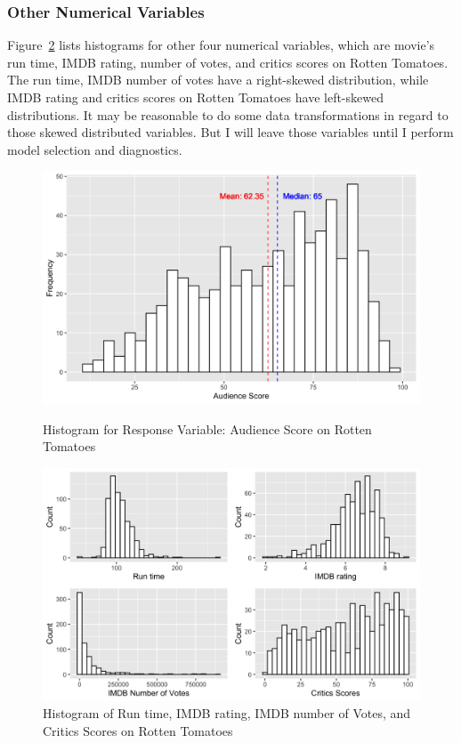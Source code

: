 \documentclass{article}
\begin{document}
\subsubsection{Other Numerical Variables}
Figure~\ref{fig: 6} lists histograms for other four numerical variables, which are movie's run time, IMDB rating, number of votes, and critics scores on Rotten Tomatoes. The run time, IMDB number of votes have a right-skewed distribution, while IMDB rating and critics scores on Rotten Tomatoes have left-skewed distributions. It may be reasonable to do some data transformations in regard to those skewed distributed variables. But I will leave those variables until I perform model selection and diagnostics.

\begin{figure}[htbp]
\caption{Histogram for Response Variable: Audience Score on Rotten Tomatoes}
\begin{center}
\includegraphics[scale=0.3]{response_variable.png}
\label{fig: 5}
\end{center}
\end{figure}

\begin{figure}[htbp]
\begin{center}
\includegraphics[scale=0.30]{other_numerical.png}
\caption{Histogram of Run time, IMDB rating, IMDB number of Votes, and Critics Scores on Rotten Tomatoes}
\label{fig: 6}
\end{center}
\end{figure}
\end{document}
